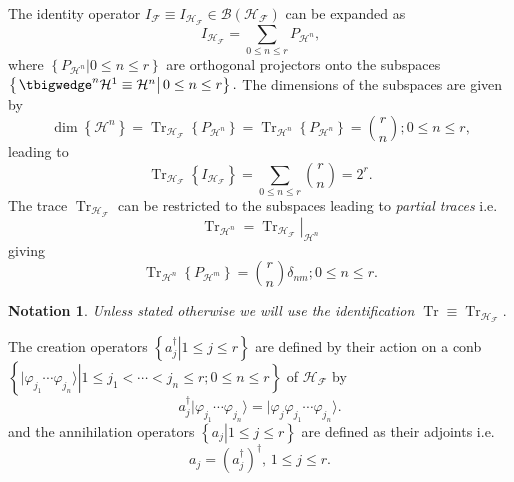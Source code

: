 \documentclass[aps, preprint]{revtex4}
\newtheorem{notation}[theorem]{Notation}
\begin{document}
The identity operator $I_{\mathcal{F}} \equiv I_{\mathcal{H}_{\mathcal{F}}} \in \mathcal{B} \left (\mathcal{H}_{\mathcal{F}}\right )$ can be expanded as
\begin{equation}I_{\mathcal{H}_{\mathcal{F}}} =\sum _{0 \leq n \leq r}P_{\mathcal{H}^{n}}\text{,}
\end{equation}where $\left \{\left .P_{\mathcal{H}^{n}}\right \vert 0 \leq n \leq r\right \}$ are orthogonal projectors onto the subspaces $\left \{\left . \tbigwedge ^{n}\mathcal{H}^{1} \equiv \mathcal{H}^{n}\right \vert 0 \leq n \leq r\right \}\text{.}$ The dimensions of the subspaces are given by
\begin{equation}\dim  \left \{\mathcal{H}^{n}\right \} =\ensuremath{\operatorname*{Tr}}_{\mathcal{H}_{\mathcal{F}}} \left \{P_{\mathcal{H}^{n}}\right \} =\ensuremath{\operatorname*{Tr}}_{\mathcal{H}^{n}} \left \{P_{\mathcal{H}^{n}}\right \} =\binom{r}{n} ;0 \leq n \leq r\text{,}
\end{equation}leading to
\begin{equation}\ensuremath{\operatorname*{Tr}}_{\mathcal{H}_{\mathcal{F}}} \left \{I_{\mathcal{H}_{\mathcal{F}}}\right \} =\sum _{0 \leq n \leq r}\binom{r}{n} =2^{r}\text{.}
\end{equation}The trace $\ensuremath{\operatorname*{Tr}}_{\mathcal{H}_{\mathcal{F}}}$ can be restricted to the subspaces leading to \emph{partial traces} i.e.
\begin{equation}\ensuremath{\operatorname*{Tr}}_{\mathcal{H}^{n}} =\left .\ensuremath{\operatorname*{Tr}}_{\mathcal{H}_{\mathcal{F}}}\right \vert _{\mathcal{H}^{n}}
\end{equation}giving
\begin{equation}\ensuremath{\operatorname*{Tr}}_{\mathcal{H}^{n}} \left \{P_{\mathcal{H}^{m}}\right \} =\binom{r}{n} \delta _{n m} ;0 \leq n \leq r\text{.}
\end{equation}


\begin{notation}
Unless stated otherwise we will use the identification $\ensuremath{\operatorname*{Tr}} \equiv \ensuremath{\operatorname*{Tr}}_{\mathcal{H}_{\mathcal{F}}}\text{.}$ 
\end{notation}

The creation operators $\left \{\left .a_{j}^{ \dag }\right \vert 1 \leq j \leq r\right \}$ are defined by their action on a conb $\left \{\left .\vert \varphi _{j_{1}} \cdots  \varphi _{j_{n}} \rangle \right \vert 1 \leq j_{1} <\cdots  <j_{n} \leq r ;0 \leq n \leq r\right \}$ of $\mathcal{H}_{\mathcal{F}}$ by
\begin{equation}a_{j}^{ \dag }\vert \varphi _{j_{1}} \cdots  \varphi _{j_{n}} \rangle  =\vert \varphi _{j} \varphi _{j_{1}} \cdots  \varphi _{j_{n}} \rangle  . \label{CREAT}
\end{equation}and the annihilation operators $\left \{\left .a_{j}\right \vert 1 \leq j \leq r\right \}$ are defined as their adjoints i.e.
\begin{equation}a_{j} =\left (a_{j}^{ \dag }\right )^{ \dag } ,\,1 \leq j \leq r\text{.}
\end{equation}
\end{document}
